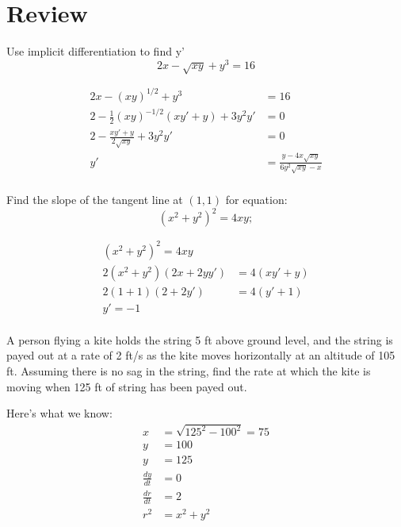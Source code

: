 \documentclass[fleqn]{exam}
\begin{document}
\section{Review}
\begin{questions}

\question
Use implicit differentiation to find y'
\[
  2x - \sqrt{xy} + y^3 = 16
\]

\begin{solution}
\begin{align*}
  2x - (xy)^{1/2} + y^3 &= 16 \\
  2 - \frac{1}{2}(xy)^{-1/2}(xy' + y) + 3y^2y' &= 0 \\
  2 - \frac{xy' + y}{2 \sqrt{xy}} + 3y^2y' &= 0 \\
   y' &= \frac{y - 4x\sqrt{xy}}{6y^2\sqrt{xy} - x} \\
\end{align*}
\end{solution}

\question
Find the slope of the tangent line at $(1, 1)$ for equation:
\[
  (x^2 + y^2)^2 = 4xy; 
\]

\begin{solution}
\begin{align*}
  (x^2 + y^2)^2 = 4xy \\
  2(x^2 + y^2)(2x + 2yy') &= 4(xy' + y) \\
  2(1+1)(2 + 2y') &= 4(y' + 1) \\
  y' = -1 \\
\end{align*}
\end{solution}

\ifprintanswers
\pagebreak
\fi

\question
A person flying a kite holds the string 5 ft above ground level, and the string is payed out at a rate of 2 ft/s as the
kite moves horizontally at an altitude of 105 ft.  Assuming there is no sag in the string, find the rate at which the
kite is moving when 125 ft of string has been payed out.

\begin{solution}
Here's what we know:
\begin{align*}
  x & = \sqrt{125^2 - 100^2} = 75 \\
  y &= 100 \\
  y &= 125 \\
  \frac{dy}{dt} &= 0 \\
  \frac{dr}{dt} &= 2 \\  
  r^2 &= x^2 + y^2 \\
\end{align*}


\end{solution}
\end{questions}
\end{document}
